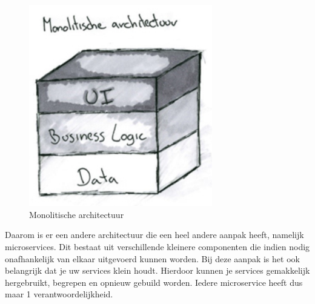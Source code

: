 \begin{figure}[h!]
    \centering
    \includegraphics[width=80mm]{../monolith.png}
    \caption{Monolitische architectuur}
        
\end{figure}

Daarom is er een andere architectuur die een heel andere aanpak heeft, namelijk microservices. Dit bestaat uit verschillende kleinere componenten die indien nodig onafhankelijk van elkaar uitgevoerd kunnen worden. Bij deze aanpak is het ook belangrijk dat je uw services klein houdt. Hierdoor kunnen je services gemakkelijk hergebruikt, begrepen en opnieuw gebuild worden. Iedere microservice heeft dus maar 1 verantwoordelijkheid.

